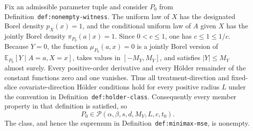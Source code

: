 Fix an admissible parameter tuple and consider \(P_0\) from Definition~\texttt{def:nonempty-witness}. The uniform law of \(X\) has the designated Borel density \(p_X(x)=1\), and the conditional uniform law of \(A\) given \(X\) has the jointly Borel density \(\pi_{P_0}(a\mid x)=1\). Since \(0<c\le1\), one has \(c\le1\le1/c\). Because \(Y=0\), the function \(\mu_{P_0}(a,x)=0\) is a jointly Borel version of \(\mathbb E_{P_0}[Y\mid A=a,X=x]\), takes values in \([-M_Y,M_Y]\), and satisfies \(\lvert Y\rvert\le M_Y\) almost surely. Every positive-order derivative and every Hölder remainder of the constant functions zero and one vanishes. Thus all treatment-direction and fixed-slice covariate-direction Hölder conditions hold for every positive radius \(L\) under the convention in Definition~\texttt{def:holder-class}. Consequently every member property in that definition is satisfied, so
\[
P_0\in\mathcal P(\alpha,\beta,s,d,M_Y,L,c,t_0).
\]
The class, and hence the supremum in Definition~\texttt{def:minimax-mse}, is nonempty.